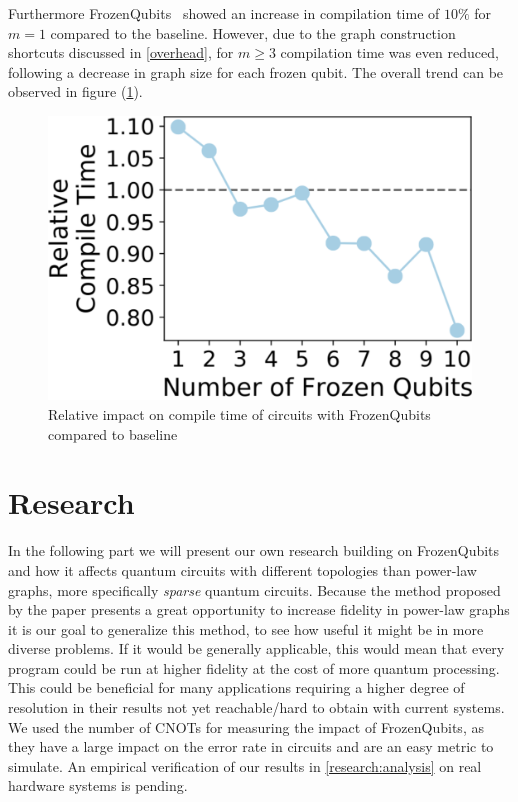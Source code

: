 Furthermore FrozenQubits~\cite{frozenqubits} showed an increase in compilation time of $10\%$ for $m=1$ compared to the baseline. However, due to the graph construction shortcuts discussed in \ref{overhead}, for $m\geq 3$ compilation time was even reduced, following a decrease in graph size for each frozen qubit. The overall trend can be observed in figure (\ref{fig:compilation}).
\begin{figure}[H]
    \centering
    \includegraphics[width=0.5\linewidth]{Results/Results_Compilation.png}
    \caption{Relative impact on compile time of circuits with FrozenQubits compared to baseline}
    \label{fig:compilation}
\end{figure}
\section{Research}
In the following part we will present our own research building on FrozenQubits~\cite{frozenqubits} and how it affects quantum circuits with different topologies than power-law graphs, more specifically \emph{sparse} quantum circuits. Because the method proposed by the paper presents a great opportunity to increase fidelity in power-law graphs it is our goal to generalize this method, to see how useful it might be in more diverse problems. If it would be generally applicable, this would mean that every program could be run at higher fidelity at the cost of more quantum processing. This could be beneficial for many applications requiring a higher degree of resolution in their results not yet reachable/hard to obtain with current systems. We used the number of CNOTs for measuring the impact of FrozenQubits, as they have a large impact on the error rate in circuits and are an easy metric to simulate. An empirical verification of our results in \ref{research:analysis} on real hardware systems is pending.
